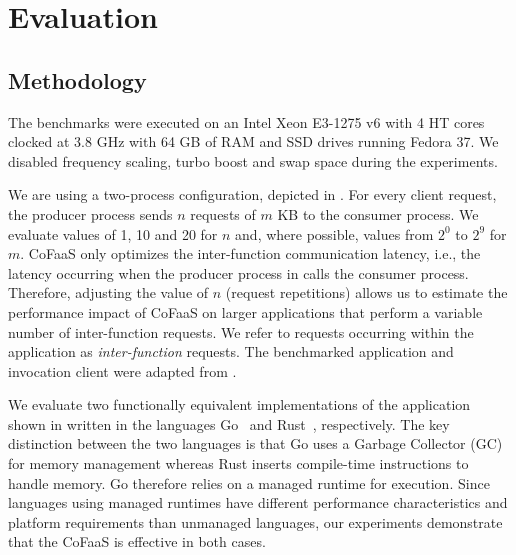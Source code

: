 \section{Evaluation}
\label{es:sec:evaluation}

\subsection{Methodology}
\label{es:sec:methodology}


The benchmarks were executed on an Intel Xeon E3-1275 v6 with 4 HT cores clocked at 3.8 GHz with 64 GB of RAM and SSD drives running Fedora 37. We disabled frequency scaling, turbo boost and swap space during the experiments.

We are using a two-process configuration, depicted in . For every client request, 
the producer process sends $n$ requests of $m$ KB to the consumer process. We evaluate values of 1, 10 and 20 for $n$ and, where possible, values from $2^{0}$ to $2^{9}$ for $m$. CoFaaS only optimizes the inter-function communication latency, i.e., the latency occurring when the producer process in  calls the consumer process.
Therefore, adjusting the value of $n$ (request repetitions) allows us to estimate the performance impact of CoFaaS on larger applications that perform a variable number of inter-function requests. We refer to requests occurring within the application as \emph{inter-function} requests. The benchmarked  application and invocation client were adapted from \cite{ustiugov:benchmarking}.

We evaluate two functionally equivalent implementations of the application shown in  written in the languages Go~\cite{golang} and Rust~\cite{rust}, respectively. The key distinction between the two languages is that Go uses a Garbage Collector (GC) for memory management whereas Rust inserts compile-time instructions to handle memory. Go therefore relies on a managed runtime for execution. Since languages using managed runtimes have different performance characteristics and platform requirements than unmanaged languages, our experiments demonstrate that the CoFaaS is %
effective in both cases.

